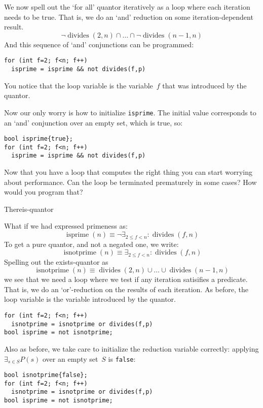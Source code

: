 We now spell out the `for all' quantor iteratively
as a loop where each iteration needs to be true.
That is, we do an `and' reduction on some iteration-dependent result.
\[ 
\neg\mathop{\mathrm{divides}}(2,n)
\cap \ldots \cap
\neg\mathop{\mathrm{divides}}(n-1,n)
\]
And this sequence of `and' conjunctions can be programmed:
\begin{lstlisting}
for (int f=2; f<n; f++)
  isprime = isprime && not divides(f,p)
\end{lstlisting}
You notice that the loop variable is the variable~$f$
that was introduced by the quantor.

Now our only worry is how to initialize \lstinline+isprime+.
The initial value corresponds to an `and' conjunction over
an empty set, which is true, so:
\begin{lstlisting}
bool isprime{true};
for (int f=2; f<n; f++)
  isprime = isprime && not divides(f,p)
\end{lstlisting}
\begin{exercise}
  Now that you have a loop that computes the right thing
  you can start worrying about performance.
  Can the loop be terminated prematurely in some cases?
  How would you program that?
\end{exercise}

 {Thereis-quantor}

What if we had expressed primeness as:
\[
\mathop{\mathrm{isprime}}(n) \equiv
\neg\exists_{2\leq f<n}\colon \mathop{\mathrm{divides}}(f,n)
\]
To get a pure quantor, and not a negated one,  we write:
\[
\mathop{\mathrm{isnotprime}}(n) \equiv
\exists_{2\leq f<n}\colon \mathop{\mathrm{divides}}(f,n)
\]
Spelling out the exists-quantor as
\[
\mathop{\mathrm{isnotprime}}(n) \equiv
\mathop{\mathrm{divides}}(2,n)
\cup \ldots \cup
\mathop{\mathrm{divides}}(n-1,n)
\]
we see that we need a loop
where we test if any iteration satisifies a predicate.
That is, we do an `or'-reduction on the results of each iteration.
As before, the loop variable is the variable introduced by the quantor.
\begin{lstlisting}
for (int f=2; f<n; f++)
  isnotprime = isnotprime or divides(f,p)
bool isprime = not isnotprime;
\end{lstlisting}

Also as before, we take care to initialize the reduction variable correctly:
applying $\exists_{s\in S}P(s)$ over an empty set~$S$ is \lstinline{false}:
\begin{lstlisting}
bool isnotprime{false};
for (int f=2; f<n; f++)
  isnotprime = isnotprime or divides(f,p)
bool isprime = not isnotprime;
\end{lstlisting}

